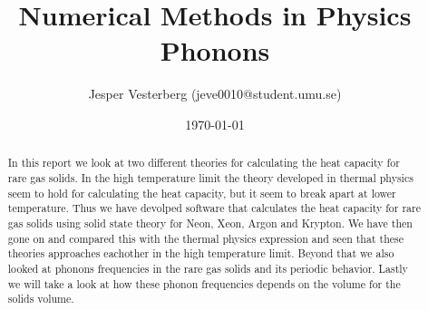 \title{Numerical Methods in Physics \\ Phonons}
\author{Jesper Vesterberg (jeve0010@student.umu.se)}
\date{\today}

\begin{titlepage}
  \maketitle
  \thispagestyle{fancy}
  \rhead{\today}
  \begin{abstract}
    In this report we look at two different theories for calculating the heat capacity for rare gas solids. In the high temperature limit the theory developed in thermal physics seem to hold for calculating the heat capacity, but it seem to break apart at lower temperature. Thus we have devolped software that calculates the heat capacity for rare gas solids using solid state theory for Neon, Xeon, Argon and Krypton. We have then gone on and compared this with the thermal physics expression and seen that these theories approaches eachother in the high temperature limit. Beyond that we also looked at phonons frequencies in the rare gas solids and its periodic behavior. Lastly we will take a look at how these phonon frequencies depends on the volume for the solids volume. 
  \end{abstract}
\end{titlepage}
